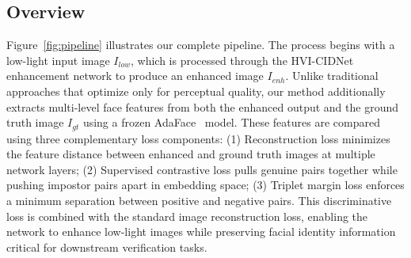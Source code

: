 \documentclass[12pt,a4paper]{article}
\begin{document}
\subsection{Overview}

Figure~\ref{fig:pipeline} illustrates our complete pipeline. The process begins with a low-light input image $I_{low}$, which is processed through the HVI-CIDNet enhancement network to produce an enhanced image $I_{enh}$. Unlike traditional approaches that optimize only for perceptual quality, our method additionally extracts multi-level face features from both the enhanced output and the ground truth image $I_{gt}$ using a frozen AdaFace~\cite{kim2022adaface} model. These features are compared using three complementary loss components: (1) Reconstruction loss minimizes the feature distance between enhanced and ground truth images at multiple network layers; (2) Supervised contrastive loss pulls genuine pairs together while pushing impostor pairs apart in embedding space; (3) Triplet margin loss enforces a minimum separation between positive and negative pairs. This discriminative loss is combined with the standard image reconstruction loss, enabling the network to enhance low-light images while preserving facial identity information critical for downstream verification tasks.
\end{document}
